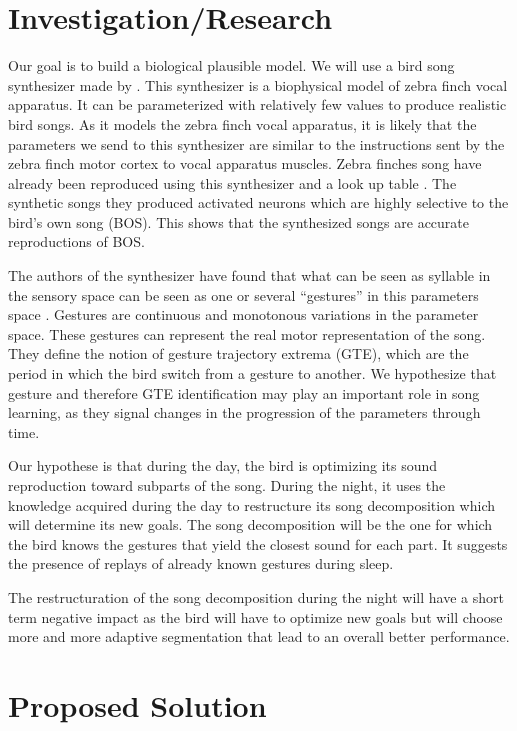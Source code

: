 \documentclass[a4paper]{article}
\begin{document}
\begin{multicols}{2}
\section*{Investigation/Research}

Our goal is to build a biological plausible model. We will use a bird song
synthesizer made by \textcite{boari_automatic_2015}. This synthesizer is a
biophysical model of zebra finch vocal apparatus. It can be parameterized with
relatively few values to produce realistic bird songs. As it models the zebra
finch vocal apparatus, it is likely that the parameters we send to this
synthesizer are similar to the instructions sent by the zebra finch motor cortex
to vocal apparatus muscles. Zebra finches song have already been reproduced
using this synthesizer and a look up table \parencite{boari_automatic_2015}. The
synthetic songs they produced activated neurons which are highly selective to
the bird's own song (BOS). This shows that the synthesized songs are accurate
reproductions of BOS.

The authors of the synthesizer have found that what can be seen as syllable in
the sensory space can be seen as one or several ``gestures'' in this parameters
space \parencite{amador_low_2014, boari_automatic_2015}. Gestures are continuous
and monotonous variations in the parameter space. These gestures can represent
the real motor representation of the song. They define the notion of gesture
trajectory extrema (GTE), which are the period in which the bird switch from a
gesture to another. We hypothesize that gesture and therefore GTE identification
may play an important role in song learning, as they signal changes in the
progression of the parameters through time.

Our hypothese is that during the day, the bird is optimizing its sound
reproduction toward subparts of the song. During the night, it uses the
knowledge acquired during the day to restructure its song decomposition which
will determine its new goals. The song decomposition will be the one for which
the bird knows the gestures that yield the closest sound for each part. It
suggests the presence of replays of already known gestures during sleep.

The restructuration of the song decomposition during the night will have a short
term negative impact as the bird will have to optimize new goals but will
choose more and more adaptive segmentation that lead to an overall better
performance.

\section*{Proposed Solution}


\end{multicols}
\end{document}
